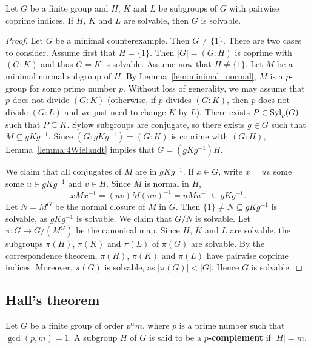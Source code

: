 \begin{theorem}[Wielandt]
	\label{theorem:Wielandt:solvable}
	Let $G$ be a finite group and $H$, $K$ and $L$ be 
        subgroups of $G$ with pairwise coprime indices. 
        If $H$, $K$ and $L$ are solvable, then $G$ is 
	solvable.
\end{theorem}

\begin{proof}
    Let $G$ be a minimal counterexample. Then $G\ne\{1\}$. 
    There are two cases to consider. 
    Assume first that $H=\{1\}$. Then 
    $|G|=(G:H)$ is coprime with $(G:K)$ and thus $G=K$ is solvable. 
    Assume now that  
    $H\ne \{1\}$. Let $M$ be a minimal normal subgroup of $H$. By Lemma~\ref{lem:minimal_normal}, 
    $M$ is a $p$-group for some prime number $p$. 
    Without loss of generality, we may assume that $p$ does not divide $(G:K)$ (otherwise, if $p$ divides $(G:K)$, then 
    $p$ does not divide $(G:L)$ and we just need to change $K$ by $L$). 
    There exists $P\in\mathrm{Syl}_p(G)$ such that $P\subseteq K$. Sylow subgroups are conjugate, so there exists 
    $g\in G$ such that $M\subseteq
	gKg^{-1}$. Since $(G:gKg^{-1})=(G:K)$ is coprime with $(G:H)$, Lemma~\ref{lemma:4Wielandt} implies that
    $G=(gKg^{-1})H$. 
	
    We claim that all conjugates of $M$ are in $gKg^{-1}$. 
    If $x\in G$, write $x=uv$ some some $u\in 
	gKg^{-1}$ and $v\in H$. Since $M$ is normal in $H$, 
	\[
	xMx^{-1}=(uv)M(uv)^{-1}=uMu^{-1}\subseteq gKg^{-1}.
	\]
        Let $N=M^G$ be the normal closure of $M$ in $G$. 
	Then $\{1\}\ne N\subseteq gKg^{-1}$ is solvable, as $gKg^{-1}$ is 
	solvable. We claim that $G/N$ is solvable. Let 
         $\pi\colon G\to G/(M^G)$ be the canonical map. Since $H$, $K$ and $L$ are solvable, 
    the subgroups $\pi(H)$, $\pi(K)$ and $\pi(L)$ of $\pi(G)$ are solvable. By the correspondence theorem, $\pi(H)$, $\pi(K)$ and $\pi(L)$ have pairwise coprime indices. Moreover, $\pi(G)$ is solvable, as
    $|\pi(G)|<|G|$.  
        Hence 
        $G$ is solvable. 
\end{proof}

\subsection{Hall's theorem}

\begin{definition}
Let $G$ be a finite group of order $p^{\alpha}m$, where $p$ is a prime number such that 
$\gcd(p,m)=1$. A subgroup 
$H$ of $G$ is said to be a \textbf{$p$-complement} if $|H|=m$. 
\end{definition}

